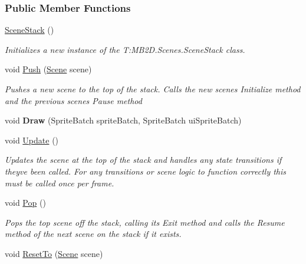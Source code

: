 \subsubsection*{Public Member Functions}
\begin{DoxyCompactItemize}
\item 
\hyperlink{class_m_b2_d_1_1_scenes_1_1_scene_stack_afae8584f72ea2eb6848af3781e7c4137}{Scene\+Stack} ()
\begin{DoxyCompactList}\small\item\em Initializes a new instance of the T\+:\+M\+B2\+D.\+Scenes.\+Scene\+Stack class. \end{DoxyCompactList}\item 
void \hyperlink{class_m_b2_d_1_1_scenes_1_1_scene_stack_a22760622453ac16621534bc324ec039f}{Push} (\hyperlink{class_m_b2_d_1_1_scenes_1_1_scene}{Scene} scene)
\begin{DoxyCompactList}\small\item\em Pushes a new scene to the top of the stack. Calls the new scenes Initialize method and the previous scenes Pause method \end{DoxyCompactList}\item 
\hypertarget{class_m_b2_d_1_1_scenes_1_1_scene_stack_aad467942bd0fb8029b67af4e981c384a}{}\label{class_m_b2_d_1_1_scenes_1_1_scene_stack_aad467942bd0fb8029b67af4e981c384a} 
void {\bfseries Draw} (Sprite\+Batch sprite\+Batch, Sprite\+Batch ui\+Sprite\+Batch)
\item 
void \hyperlink{class_m_b2_d_1_1_scenes_1_1_scene_stack_a8486b29eb65458e88512989201772984}{Update} ()
\begin{DoxyCompactList}\small\item\em Updates the scene at the top of the stack and handles any state transitions if they\textquotesingle{}ve been called. For any transitions or scene logic to function correctly this must be called once per frame. \end{DoxyCompactList}\item 
void \hyperlink{class_m_b2_d_1_1_scenes_1_1_scene_stack_a134c3aff1731fb86116b78cac7112464}{Pop} ()
\begin{DoxyCompactList}\small\item\em Pops the top scene off the stack, calling its Exit method and calls the Resume method of the next scene on the stack if it exists. \end{DoxyCompactList}\item 
void \hyperlink{class_m_b2_d_1_1_scenes_1_1_scene_stack_a521a38426d3e85caeb53b2909b623562}{Reset\+To} (\hyperlink{class_m_b2_d_1_1_scenes_1_1_scene}{Scene} scene)

\end{DoxyCompactItemize}
